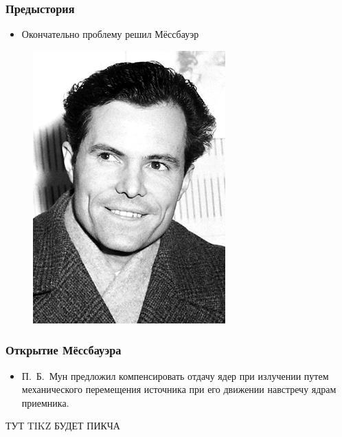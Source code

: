 \documentclass[t]{beamer}
\begin{document}
\begin{frame}
  \frametitle{Предыстория}
  \begin{itemize}
    \item Окончательно проблему решил Мёссбауэр
  \end{itemize}

  \begin{figure}[h]
    \centering
    \includegraphics[height=.7\textheight]{img/messbauer.png}
  \end{figure}
\end{frame}

\begin{frame}
  \frametitle{Открытие Мёссбауэра}

  \begin{itemize}
    
    \item П.~Б.~Мун предложил компенсировать отдачу ядер при излучении путем
      механического перемещения источника при его движении навстречу ядрам
      приемника.\pause
  \end{itemize}

  ТУТ TIKZ БУДЕТ ПИКЧА
\end{frame}
\end{document}

